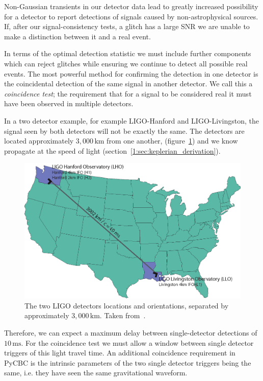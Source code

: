 Non-Gaussian transients in our detector data lead to greatly increased possibility for a \gwadj detector to report detections of \gwadj signals caused by non-astrophysical sources. If, after our signal-consistency tests, a glitch has a large SNR we are unable to make a distinction between it and a real event.

In terms of the optimal detection statistic we must include further components which can reject glitches while ensuring we continue to detect all possible real events. The most powerful method for confirming the detection in one detector is the coincidental detection of the same signal in another detector. We call this a \textit{coincidence test}; the requirement that for a signal to be considered real it must have been observed in multiple detectors.

In a two detector example, for example LIGO-Hanford and LIGO-Livingston, the signal seen by both detectors will not be exactly the same. The detectors are located approximately $3,000 \, \text{km}$ from one another, (figure~\ref{2:fig:observatories}) and we know \gws propagate at the speed of light (section~\ref{1:sec:keplerian_derivation}).
%
\begin{figure}
    \centering
    \includegraphics[width=0.8\linewidth]{images/2_searches/observatories.png}
    \caption{The two LIGO detectors locations and orientations, separated by approximately $3,000 \, \text{km}$. Taken from~\cite{Brown_Thesis:2004}.}
    \label{2:fig:observatories}
\end{figure}
%
Therefore, we can expect a maximum delay between single-detector detections of $10 \, \text{ms}$. For the coincidence test we must allow a window between single detector triggers of this light travel time. An additional coincidence requirement in PyCBC is the intrinsic parameters of the two single detector triggers being the same, i.e. they have seen the same gravitational waveform.


